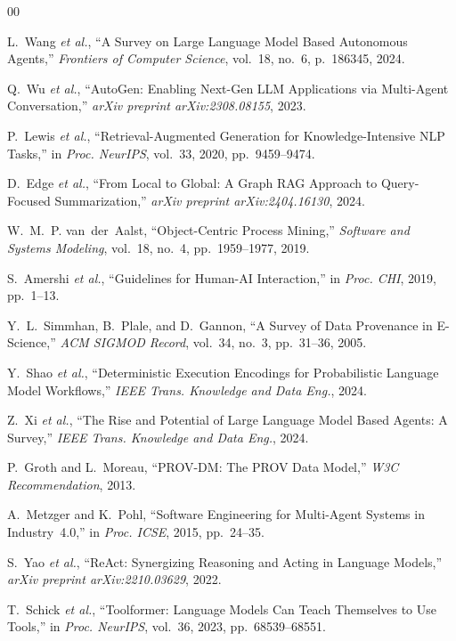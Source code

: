 \documentclass[conference]{IEEEtran}
\begin{document}
\begin{thebibliography}{00}

L.~Wang \textit{et al.},
``A Survey on Large Language Model Based Autonomous Agents,''
\textit{Frontiers of Computer Science}, vol.~18, no.~6, p.~186345, 2024.

Q.~Wu \textit{et al.},
``AutoGen: Enabling Next-Gen LLM Applications via Multi-Agent Conversation,''
\textit{arXiv preprint arXiv:2308.08155}, 2023.

P.~Lewis \textit{et al.},
``Retrieval-Augmented Generation for Knowledge-Intensive NLP Tasks,''
in \textit{Proc. NeurIPS}, vol.~33, 2020, pp.~9459--9474.

D.~Edge \textit{et al.},
``From Local to Global: A Graph RAG Approach to Query-Focused Summarization,''
\textit{arXiv preprint arXiv:2404.16130}, 2024.

W.~M.~P. van~der~Aalst,
``Object-Centric Process Mining,''
\textit{Software and Systems Modeling}, vol.~18, no.~4, pp.~1959--1977, 2019.

S.~Amershi \textit{et al.},
``Guidelines for Human-AI Interaction,''
in \textit{Proc. CHI}, 2019, pp.~1--13.

Y.~L.~Simmhan, B.~Plale, and D.~Gannon,
``A Survey of Data Provenance in E-Science,''
\textit{ACM SIGMOD Record}, vol.~34, no.~3, pp.~31--36, 2005.

Y.~Shao \textit{et al.},
``Deterministic Execution Encodings for Probabilistic Language Model Workflows,''
\textit{IEEE Trans. Knowledge and Data Eng.}, 2024.

Z.~Xi \textit{et al.},
``The Rise and Potential of Large Language Model Based Agents: A Survey,''
\textit{IEEE Trans. Knowledge and Data Eng.}, 2024.

P.~Groth and L.~Moreau,
``PROV-DM: The PROV Data Model,''
\textit{W3C Recommendation}, 2013.

A.~Metzger and K.~Pohl,
``Software Engineering for Multi-Agent Systems in Industry~4.0,''
in \textit{Proc. ICSE}, 2015, pp.~24--35.

S.~Yao \textit{et al.},
``ReAct: Synergizing Reasoning and Acting in Language Models,''
\textit{arXiv preprint arXiv:2210.03629}, 2022.

T.~Schick \textit{et al.},
``Toolformer: Language Models Can Teach Themselves to Use Tools,''
in \textit{Proc. NeurIPS}, vol.~36, 2023, pp.~68539--68551.

\end{thebibliography}
\end{document}
